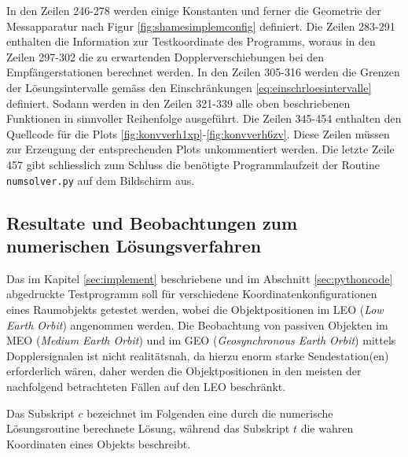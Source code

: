\documentclass[a4paper,12pt]{article}
\numberwithin{equation}{section}
\begin{document}
In den Zeilen 246-278 werden einige Konstanten und ferner die Geometrie der Messapparatur nach Figur \ref{fig:shamesimplemconfig} definiert. Die Zeilen 283-291 enthalten die Information zur Testkoordinate des Programms, woraus in den Zeilen 297-302 die zu erwartenden Dopplerverschiebungen bei den Empfängerstationen berechnet werden. In den Zeilen 305-316 werden die Grenzen der Lösungsintervalle gemäss den Einschränkungen \eqref{eq:einschrloesintervalle} definiert. Sodann werden in den Zeilen 321-339 alle oben beschriebenen Funktionen in sinnvoller Reihenfolge ausgeführt. Die Zeilen 345-454 enthalten den Quellcode für die Plots \ref{fig:konvverh1xp}-\ref{fig:konvverh6zv}. Diese Zeilen müssen zur Erzeugung der entsprechenden Plots unkommentiert werden. Die letzte Zeile 457 gibt schliesslich zum Schluss die benötigte Programmlaufzeit der Routine \verb|numsolver.py| auf dem Bildschirm aus.

\subsection{Resultate und Beobachtungen zum numerischen Lösungsverfahren}
Das im Kapitel \ref{sec:implement} beschriebene und im Abschnitt \ref{sec:pythoncode} abgedruckte Testprogramm soll für verschiedene Koordinatenkonfigurationen eines Raumobjekts getestet werden, wobei die Objektpositionen im LEO (\textit{Low Earth Orbit}) angenommen werden. Die Beobachtung von passiven Objekten im MEO (\textit{Medium Earth Orbit}) und im GEO (\textit{Geosynchronous Earth Orbit}) mittels Dopplersignalen ist nicht realitätsnah, da hierzu enorm starke Sendestation(en) erforderlich wären, daher werden die Objektpositionen in den meisten der nachfolgend betrachteten Fällen auf den LEO beschränkt.

Das Subskript $c$ bezeichnet im Folgenden eine durch die numerische Lösungsroutine berechnete Lösung, während das Subskript $t$ die wahren Koordinaten eines Objekts beschreibt.
\end{document}

